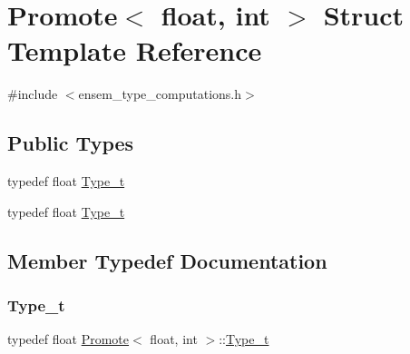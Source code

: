 \hypertarget{structPromote_3_01float_00_01int_01_4}{}\section{Promote$<$ float, int $>$ Struct Template Reference}
\label{structPromote_3_01float_00_01int_01_4}


{\ttfamily \#include $<$ensem\+\_\+type\+\_\+computations.\+h$>$}

\subsection*{Public Types}
\begin{DoxyCompactItemize}
\item 
typedef float \mbox{\hyperlink{structPromote_3_01float_00_01int_01_4_a8df52b198586e88fc51366c1f8774543}{Type\+\_\+t}}
\item 
typedef float \mbox{\hyperlink{structPromote_3_01float_00_01int_01_4_a8df52b198586e88fc51366c1f8774543}{Type\+\_\+t}}
\end{DoxyCompactItemize}


\subsection{Member Typedef Documentation}
\mbox{\label{structPromote_3_01float_00_01int_01_4_a8df52b198586e88fc51366c1f8774543}} 
\subsubsection{\texorpdfstring{Type\_t}{Type\_t}\hspace{0.1cm}{\footnotesize\ttfamily [1/2]}}
{\footnotesize\ttfamily typedef float \mbox{\hyperlink{structPromote}{Promote}}$<$ float, int $>$\+::\mbox{\hyperlink{structPromote_3_01float_00_01int_01_4_a8df52b198586e88fc51366c1f8774543}{Type\+\_\+t}}}

\mbox{\label{structPromote_3_01float_00_01int_01_4_a8df52b198586e88fc51366c1f8774543}} 
